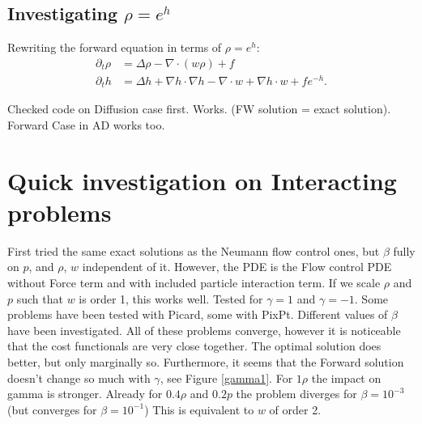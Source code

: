 \documentclass[11pt, a4paper]{article}
\theoremstyle{definition}
\begin{document}
	
\subsection{Investigating $\rho = e^h$}	
	Rewriting the forward equation in terms of $\rho = e^h$:
	\begin{align*}
	\partial_t \rho &= \Delta \rho - \nabla \cdot (w \rho) + f\\
	\partial_t h &= \Delta h + \nabla h \cdot \nabla h - \nabla \cdot w + \nabla h \cdot w + fe^{-h}.
	\end{align*}
	
	Checked code on Diffusion case first. Works. (FW solution = exact solution). Forward Case in AD works too.

\section{Quick investigation on Interacting problems}
First tried the same exact solutions as the Neumann flow control ones, but $ \beta$ fully on $p$, and $\rho$, $w$ independent of it. However, the PDE is the Flow control PDE without Force term and with included particle interaction term.
If we scale $\rho$ and $p$ such that $w$ is order 1, this works well.
Tested for $\gamma = 1$ and $\gamma = -1$. Some problems have been tested with Picard, some with PixPt. Different values of $\beta$ have been investigated.
All of these problems converge, however it is noticeable that the cost functionals are very close together. The optimal solution does better, but only marginally so. Furthermore, it seems that the Forward solution doesn't change so much with $\gamma$, see Figure \ref{gamma1}. For $1\rho$ the impact on gamma is stronger. Already for $0.4\rho$ and $0.2 p$ the problem diverges for $\beta =10^{-3}$ (but converges for $\beta = 10^{-1}$) This is equivalent to $w$ of order 2.\\
\end{document}
